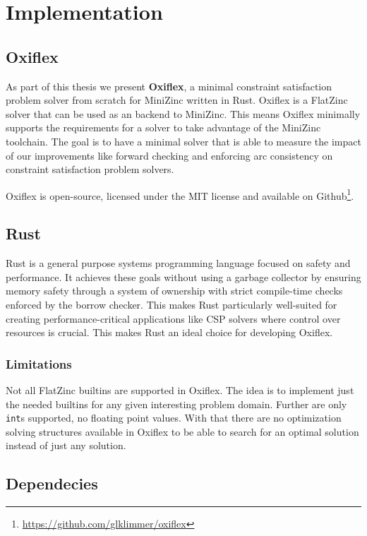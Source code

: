 \chapter{Implementation} \label{chap:impl}

\section{Oxiflex}

As part of this thesis we present \textbf{Oxiflex}, a minimal constraint satisfaction problem solver from scratch for MiniZinc written in Rust. Oxiflex is a FlatZinc solver that can be used as an backend to MiniZinc. This means Oxiflex minimally supports the requirements for a solver to take advantage of the MiniZinc toolchain. The goal is to have a minimal solver that is able to measure the impact of our improvements like forward checking and enforcing arc consistency on constraint satisfaction problem solvers.

Oxiflex is open-source, licensed under the MIT license and available on Github\footnote{\url{https://github.com/glklimmer/oxiflex}}.

\section{Rust}

Rust \cite{rust:2014} is a general purpose systems programming language focused on safety and performance. It achieves these goals without using a garbage collector by ensuring memory safety through a system of ownership with strict compile-time checks enforced by the borrow checker. This makes Rust particularly well-suited for creating performance-critical applications like CSP solvers where control over resources is crucial. This makes Rust an ideal choice for developing Oxiflex.

\subsection{Limitations}

Not all FlatZinc builtins are supported in Oxiflex. The idea is to implement just the needed builtins for any given interesting problem domain. Further are only \verb|int|s supported, no floating point values. With that there are no optimization solving structures available in Oxiflex to be able to search for an optimal solution instead of just any solution.

\section{Dependecies}

